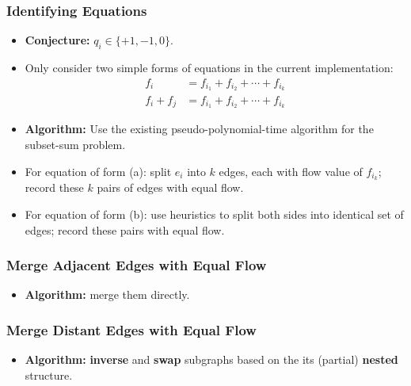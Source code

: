 \frame
{
	\frametitle{Identifying Equations}
	\begin{itemize}
	\item {\bf Conjecture:} $q_i \in \{+1, -1, 0\}$.
	\vspace{0.2cm}
	\item Only consider two simple forms of equations in the current implementation:
		\begin{align}
		f_i & =  f_{i_1} + f_{i_2} + \cdots + f_{i_k} \tag{a}\\
		f_i + f_j & = f_{i_1} + f_{i_2} + \cdots + f_{i_k} \tag{b}
		\end{align}
	\item {\bf Algorithm:} Use the existing pseudo-polynomial-time algorithm for the subset-sum problem.
	\vspace{0.2cm}
	\item For equation of form (a): split $e_i$ into $k$ edges, each with flow
	value of $f_{i_k}$; record these $k$ pairs of edges with equal flow.
	\vspace{0.2cm}
	\item For equation of form (b): use heuristics to split both sides into
			identical set of edges; record these pairs with equal flow.
	\end{itemize}
}

\frame
{
	\frametitle{Merge Adjacent Edges with Equal Flow}
	\vspace{-2.0cm}

	\begin{itemize}
	\item {\bf Algorithm:} merge them directly.
	\end{itemize}

	\vspace{0.8cm}
	

}

\frame
{
	\frametitle{Merge Distant Edges with Equal Flow}
	\vspace{-3.0cm}

	\begin{itemize}
	\item {\bf Algorithm:} {\bf inverse} and {\bf swap} subgraphs based on the its (partial) {\bf nested} structure.
	\end{itemize}

	\vspace{0.8cm}
	

}


